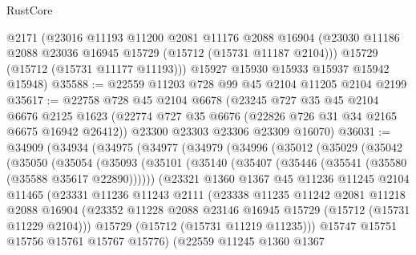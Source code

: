\begin{lexlean}{RustCore}
\begin{coremodule}
      @2171
      (@23016
        @11193
        @11200
        @2081
        @11176
        @2088
        @16904
        (@23030 @11186 @2088 @23036 @16945 @15729 (@15712 (@15731 @11187 @2104)))
        @15729
        (@15712 (@15731 @11177 @11193)))
      @15927
      @15930
      @15933
      @15937
      @15942
      @15948)
@35588 := @22559 @11203 @728 @99 @45 @2104 @11205 @2104 @2199
@35617 := @22758
    @728
    @45
    @2104
    @6678
    (@23245
      @727
      @35
      @45
      @2104
      @6676
      @2125
      @1623
      (@22774 @727 @35 @6676 (@22826 @726 @31 @34 @2165 @6675 @16942 @26412))
      @23300
      @23303
      @23306
      @23309
      @16070)
@36031 := @34909
    (@34934
      (@34975
        (@34977
          (@34979
            (@34996
              (@35012
                (@35029
                  (@35042
                    (@35050
                      (@35054
                        (@35093
                          (@35101
                            (@35140 (@35407 (@35446 (@35541 (@35580 (@35588 @35617 @22890))))))
                            (@23321
                              @1360
                              @1367
                              @45
                              @11236
                              @11245
                              @2104
                              @11465
                              (@23331
                                @11236
                                @11243
                                @2111
                                (@23338
                                  @11235
                                  @11242
                                  @2081
                                  @11218
                                  @2088
                                  @16904
                                  (@23352
                                    @11228
                                    @2088
                                    @23146
                                    @16945
                                    @15729
                                    (@15712 (@15731 @11229 @2104)))
                                  @15729
                                  (@15712 (@15731 @11219 @11235)))
                                @15747
                                @15751
                                @15756
                                @15761
                                @15767
                                @15776)
                              (@22559
                                @11245
                                @1360
                                @1367

\end{coremodule}
\end{lexlean}
